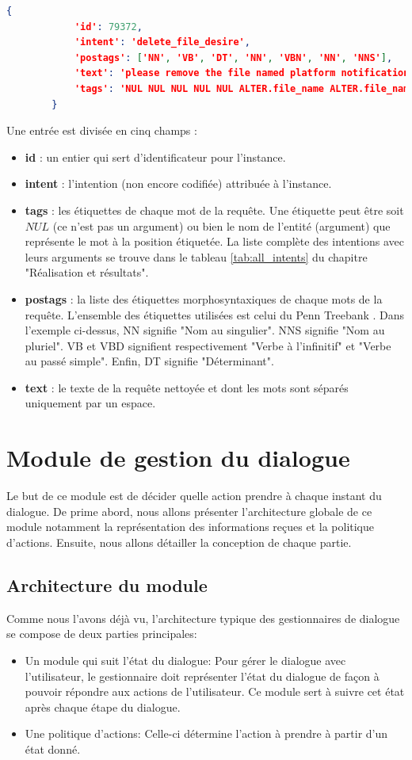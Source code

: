		\begin{lstlisting}[language=json]
		{
			'id': 79372,
			'intent': 'delete_file_desire',
			'postags': ['NN', 'VB', 'DT', 'NN', 'VBN', 'NN', 'NNS'],
			'text': 'please remove the file named platform notifications',
			'tags': 'NUL NUL NUL NUL NUL ALTER.file_name ALTER.file_name'
		}
		\end{lstlisting}
		\par
		Une entrée est divisée en cinq champs :
		\begin{itemize}
			\item \textbf{id} : un entier qui sert d'identificateur pour l'instance.
			\item \textbf{intent} : l'intention (non encore codifiée) attribuée à l'instance.
			\item \textbf{tags} : les étiquettes de chaque mot de la requête. Une étiquette peut être soit $NUL$ (ce n'est pas un argument) ou bien le nom de l'entité (argument) que représente le mot à la position étiquetée. La liste complète des intentions avec leurs arguments se trouve dans le tableau \ref{tab:all_intents} du chapitre "Réalisation et résultats".
			\item \textbf{postags} : la liste des étiquettes morphosyntaxiques de chaque mots de la requête. L'ensemble des étiquettes utilisées est celui du Penn Treebank \citep{penn_treebank}. Dans l'exemple ci-dessus, NN signifie "Nom au singulier". NNS signifie "Nom au pluriel". VB et VBD signifient respectivement "Verbe à l'infinitif" et "Verbe au passé simple". Enfin, DT signifie "Déterminant".
			\item \textbf{text} : le texte de la requête nettoyée et dont les mots sont séparés uniquement par un espace.
		\end{itemize}
\section{Module de gestion du dialogue}
Le but de ce module est de décider quelle action prendre à chaque instant du dialogue. De prime abord, nous allons présenter l'architecture globale de ce module notamment la représentation des informations reçues et la politique d'actions. Ensuite, nous allons détailler la conception de chaque partie.
\subsection{Architecture du module}
Comme nous l'avons déjà vu, l'architecture typique des gestionnaires de dialogue se compose de deux parties principales: 
\begin{itemize}
	\item Un module qui suit l'état du dialogue: Pour gérer le dialogue avec l'utilisateur, le gestionnaire doit représenter l'état du dialogue de façon à pouvoir répondre aux actions de l'utilisateur. Ce module sert à suivre cet état après chaque étape du dialogue.
	\item Une politique d'actions: Celle-ci détermine l'action à prendre à partir d'un état donné.
\end{itemize}
